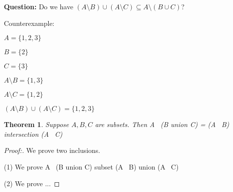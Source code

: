 \documentclass[12pt]{article}
\newtheorem{theorem}{Theorem}[section]
\begin{document}
\textbf{Question: } Do we have $(A \setminus B) \cup (A \setminus C) \subseteq A \setminus (B \cup C)$?

Counterexample:

$A = \{1, 2, 3\}$

$B = \{2\}$

$C = \{3\}$

$A \setminus B = \{1, 3\}$

$A \setminus C = \{1, 2\}$

$(A \setminus B) \cup (A \setminus C) = \{1, 2, 3\}$

\begin{theorem}
    Suppose $A, B, C$ are subsets. Then A \ (B union C) = (A \ B) intersection (A \ C)
\end{theorem}

\begin{proof}[Proof:]
    We prove two inclusions.

    (1) We prove A \ (B union C) subset (A \ B) union (A \ C)

    (2) We prove ...

\end{proof}
\end{document}
